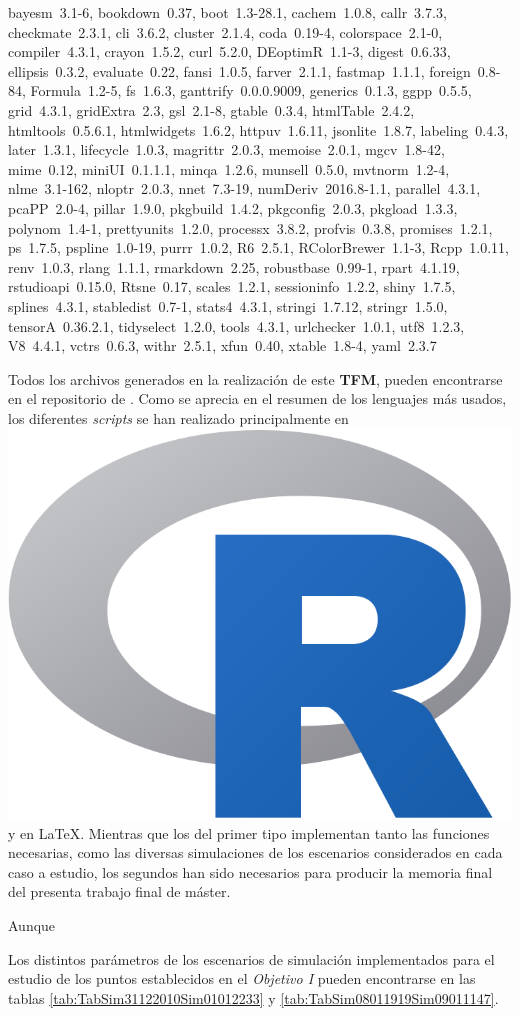 \documentclass[IB,BIB]{TFUOC}%
\newcommand{\Rlogo}{\protect\includegraphics[height=2.5ex,keepaspectratio]{Rlogo.png}}
\begin{document}
\begin{itemize}
    bayesm~3.1-6, bookdown~0.37, boot~1.3-28.1, cachem~1.0.8, callr~3.7.3, checkmate~2.3.1, cli~3.6.2, cluster~2.1.4,
    coda~0.19-4, colorspace~2.1-0, compiler~4.3.1, crayon~1.5.2, curl~5.2.0, DEoptimR~1.1-3, digest~0.6.33, ellipsis~0.3.2,
    evaluate~0.22, fansi~1.0.5, farver~2.1.1, fastmap~1.1.1, foreign~0.8-84, Formula~1.2-5, fs~1.6.3, ganttrify~0.0.0.9009,
    generics~0.1.3, ggpp~0.5.5, grid~4.3.1, gridExtra~2.3, gsl~2.1-8, gtable~0.3.4, htmlTable~2.4.2, htmltools~0.5.6.1,
    htmlwidgets~1.6.2, httpuv~1.6.11, jsonlite~1.8.7, labeling~0.4.3, later~1.3.1, lifecycle~1.0.3, magrittr~2.0.3,
    memoise~2.0.1, mgcv~1.8-42, mime~0.12, miniUI~0.1.1.1, minqa~1.2.6, munsell~0.5.0, mvtnorm~1.2-4, nlme~3.1-162,
    nloptr~2.0.3, nnet~7.3-19, numDeriv~2016.8-1.1, parallel~4.3.1, pcaPP~2.0-4, pillar~1.9.0, pkgbuild~1.4.2,
    pkgconfig~2.0.3, pkgload~1.3.3, polynom~1.4-1, prettyunits~1.2.0, processx~3.8.2, profvis~0.3.8, promises~1.2.1,
    ps~1.7.5, pspline~1.0-19, purrr~1.0.2, R6~2.5.1, RColorBrewer~1.1-3, Rcpp~1.0.11, renv~1.0.3, rlang~1.1.1,
    rmarkdown~2.25, robustbase~0.99-1, rpart~4.1.19, rstudioapi~0.15.0, Rtsne~0.17, scales~1.2.1, sessioninfo~1.2.2,
    shiny~1.7.5, splines~4.3.1, stabledist~0.7-1, stats4~4.3.1, stringi~1.7.12, stringr~1.5.0, tensorA~0.36.2.1,
    tidyselect~1.2.0, tools~4.3.1, urlchecker~1.0.1, utf8~1.2.3, V8~4.4.1, vctrs~0.6.3, withr~2.5.1, xfun~0.40, xtable~1.8-4,
    yaml~2.3.7
  \normalsize
\end{itemize}

Todos los archivos generados en la realización de este \textbf{TFM}, pueden encontrarse en el repositorio de  \cite{aitor_invernon_de_campos_codigo_2024}. Como se aprecia en el resumen de los lenguajes más usados, los diferentes \textit{scripts} se han realizado principalmente en \hspace{-.2em}\Rlogo\hspace{+.1em} y en \LaTeX. Mientras que los del primer tipo implementan tanto las funciones necesarias, como las diversas simulaciones de los escenarios considerados en cada caso a estudio, los segundos han sido necesarios para producir la memoria final del presenta trabajo final de máster.

Aunque

Los distintos parámetros de los escenarios de simulación implementados para el estudio de los puntos establecidos en el \textit{Objetivo I} pueden encontrarse en las tablas \ref{tab:TabSim31122010Sim01012233} y \ref{tab:TabSim08011919Sim09011147}.
  
\end{document}
